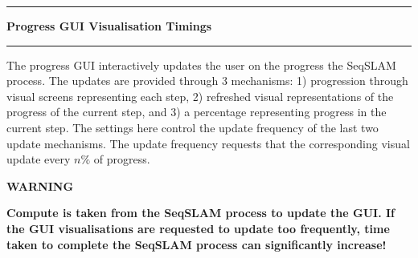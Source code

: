 \noindent\rule{\textwidth}{1pt}
\indent \textbf{Progress GUI Visualisation Timings}
\noindent\rule{\textwidth}{1pt}
\smallskip
\parbox{\textwidth}{The progress GUI interactively updates the user on the progress the SeqSLAM process. The updates are provided through 3 mechanisms: 1) progression through visual screens representing each step, 2) refreshed visual representations of the progress of the current step, and 3) a percentage representing progress in the current step. The settings here control the update frequency of the last two update mechanisms. The update frequency requests that the corresponding visual update every $n\%$ of progress.}
\smallskip
\parbox{\textwidth}{\textbf{WARNING}} \medskip
\parbox{\textwidth}{\textbf{Compute is taken from the SeqSLAM process to update the GUI. If the GUI visualisations are requested to update too frequently, time taken to complete the SeqSLAM process can significantly increase!}}
\smallskip
